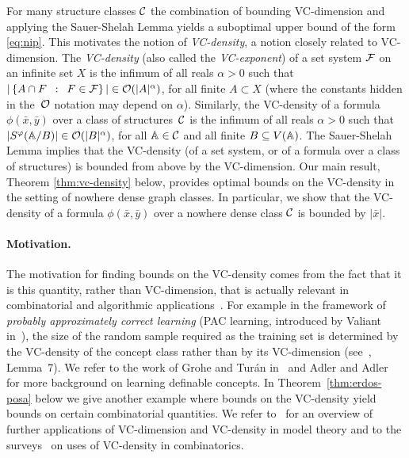 For many structure classes $\cal C$ the combination of 
bounding VC-dimension and applying the
Sauer-Shelah Lemma yields a suboptimal upper bound of the form 
\eqref{eq:nip}. This 
motivates the notion of \emph{VC-density}, a notion closely related to 
VC-dimension. The \emph{VC-density} (also called the 
\emph{VC-exponent})
of a set system $\cal F$
on an infinite set $X$ is the infimum of all reals $\alpha>0$ such that 
$|\setof{A\cap F}{F\in \cal F}|\in \Oof(|A|^\alpha)$, for all finite $A\subset X$
(where the constants hidden in the~$\Oof$ notation may depend on $\alpha$). 
Similarly, the VC-density of a formula $\phi(\bar x,\bar y)$ over a class of structures~$\cal C$
is the infimum of all reals $\alpha>0$
such that $|S^\phi(\str A/B)|\in \Oof(|B|^\alpha)$,
for all $\str A\in \cal C$ and all finite $B\subset V(\str A)$.
The Sauer-Shelah Lemma
implies that the VC-density (of a set system, or of a formula over a class of structures) is bounded from above by the VC-dimension. 
Our main result, Theorem \ref{thm:vc-density} below, provides optimal bounds on the VC-density in the setting of nowhere dense graph classes. In particular, we show that the VC-density of a formula $\phi(\bar x,\bar y)$ over a nowhere dense class $\cal C$ is bounded by $|\bar x|$.

\paragraph{Motivation.}
The motivation for finding bounds on the VC-density  comes from the fact that it is this quantity, rather than VC-di\-men\-sion, that is actually relevant in combinatorial
and algorithmic applications~\cite{Bronnimann1995,matouvsek1998geometric,Matousek:2004:BVI:1005787.1005789,chervonenkis1971theory,blumer1989learnability}. %
For example in the framework of \emph{probably approximately correct learning} 
(PAC learning, introduced by Valiant in~\cite{valiant1984theory}), the size of 
the random sample required as the training set is determined by the VC-density of the concept class 
rather than by its VC-dimension 
(see~\cite{blumer1989learnability}, Lemma~7). 
We refer to the work of Grohe and Tur\'an in~\cite{grohe2004learnability}
and Adler and Adler~\cite{adler2014interpreting} for more background on 
learning definable concepts. 
In Theorem~\ref{thm:erdos-posa} below we give another example where bounds on the VC-density yield bounds on certain combinatorial quantities.
We refer to~\cite{aschenbrenner2016vapnik} for an overview of 
further applications of VC-dimension and VC-density in model
theory and to the surveys~\cite{furedi1991traces,matouvsek1998geometric} 
on uses of VC-density in
combinatorics. 

